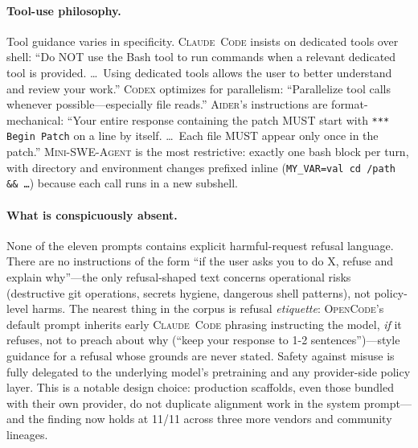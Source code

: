 \documentclass[11pt,a4paper]{article}
\newcommand{\clcode}{\textsc{Claude~Code}\xspace}
\newcommand{\cdx}{\textsc{Codex}\xspace}
\newcommand{\adr}{\textsc{Aider}\xspace}
\newcommand{\mswe}{\textsc{Mini-SWE-Agent}\xspace}
\newcommand{\ocd}{\textsc{OpenCode}\xspace}
\begin{document}
\paragraph{Tool-use philosophy.}
Tool guidance varies in specificity.
\clcode{} insists on dedicated tools over shell: ``Do NOT use the Bash tool to run commands when a relevant dedicated tool is provided. \dots\ Using dedicated tools allows the user to better understand and review your work.''
\cdx{} optimizes for parallelism: ``Parallelize tool calls whenever possible---especially file reads.''
\adr{}'s instructions are format-mechanical: ``Your entire response containing the patch MUST start with \texttt{*** Begin Patch} on a line by itself. \dots\ Each file MUST appear only once in the patch.''
\mswe{} is the most restrictive: exactly one bash block per turn, with directory and environment changes prefixed inline (\texttt{MY\_VAR=val cd /path \&\&\,\dots}) because each call runs in a new subshell.

\paragraph{What is conspicuously absent.}
None of the eleven prompts contains explicit harmful-request refusal language.
There are no instructions of the form ``if the user asks you to do X, refuse and explain why''---the only refusal-shaped text concerns operational risks (destructive git operations, secrets hygiene, dangerous shell patterns), not policy-level harms.
The nearest thing in the corpus is refusal \emph{etiquette}: \ocd{}'s default prompt inherits early \clcode{} phrasing instructing the model, \emph{if} it refuses, not to preach about why (``keep your response to 1-2 sentences'')---style guidance for a refusal whose grounds are never stated.
Safety against misuse is fully delegated to the underlying model's pretraining and any provider-side policy layer.
This is a notable design choice: production scaffolds, even those bundled with their own provider, do not duplicate alignment work in the system prompt---and the finding now holds at 11/11 across three more vendors and community lineages.
\end{document}
